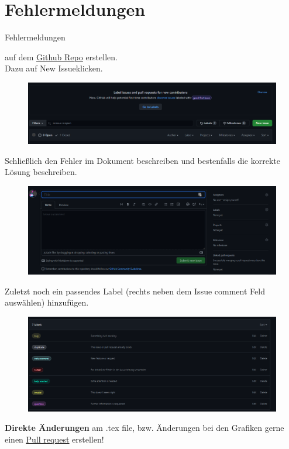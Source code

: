 \documentclass[a4paper, 11pt, ngerman, parskip=half]{scrartcl}
\begin{document}
\section{Fehlermeldungen}
\label{sec:Fehler}
\hypertarget{Fehler}{Fehlermeldungen} auf dem \href{https://github.com/etschgi1/Ex2_Fragen/issues}{\underline{Github Repo}} erstellen.\\
Dazu auf \glqq New Issue\grqq klicken.
\begin{figure}[H]
    \centering
    \includegraphics[width=15cm]{image/Misc/Issues.png}
\end{figure}
Schließlich den Fehler im Dokument beschreiben und bestenfalls die korrekte Lösung beschreiben. 
\begin{figure}[H]
    \centering
    \includegraphics[width=15cm]{image/Misc/Issue_erstellen.png}
\end{figure}
Zuletzt noch ein passendes Label (rechts neben dem Issue comment Feld auswählen) hinzufügen.
\begin{figure}[H]
    \centering
    \includegraphics[width=15cm]{image/Misc/Labels.png}
\end{figure}
\vspace{5mm}
\textbf{Direkte Änderungen} am .tex file, bzw. Änderungen bei den Grafiken gerne einen \href{https://github.com/etschgi1/Ex2_Fragen/pulls}{\underline{Pull request}} erstellen!\\
\end{document}
